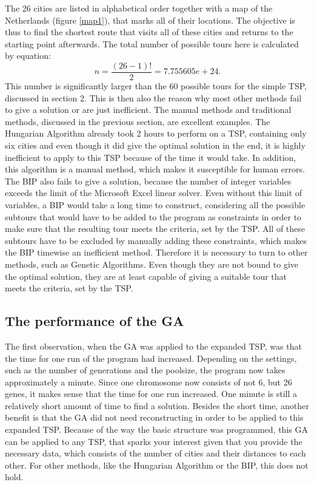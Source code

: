 \par
The 26 cities are listed in alphabetical order together with a map of the Netherlands (figure \ref{map1}), that marks all of their locations. The objective is thus to find the shortest route that visits all of these cities and returns to the starting point afterwards. The total number of possible tours here is calculated by equation: %
\[n = \frac{(26-1)!}{2} =  7.755605e+24.\]
This number is significantly larger than the 60 possible tours for the simple TSP, discussed in section 2. This is then also the reason why most other methods fail to give a solution or are just inefficient. The manual methods and traditional methods, discussed in the previous section, are excellent examples. The Hungarian Algorithm already took 2 hours to perform on a TSP, containing only six cities and even though it did give the optimal solution in the end, it is highly inefficient to apply to this TSP because of the time it would take. In addition, this algorithm is a manual method, which makes it susceptible for human errors. The BIP also fails to give a solution, because the number of integer variables exceeds the limit of the Microsoft Excel linear solver. Even without this limit of variables, a BIP would take a long time to construct, considering all the possible subtours that would have to be added to the program as constraints in order to make sure that the resulting tour meets the criteria, set by the TSP. All of these subtours have to be excluded by manually adding these constraints, which makes the BIP timewise an inefficient method. Therefore it is necessary to turn to other methods, such as Genetic Algorithms. Even though they are not bound to give the optimal solution, they are at least capable of giving a suitable tour that meets the criteria, set by the TSP.



\subsection{The performance of the GA} %
\par
The first observation, when the GA was applied to the expanded TSP, was that the time for one run of the program had increased. Depending on the settings, such as the number of generations and the poolsize, the program now takes approximately a minute. Since one chromosome now consists of not 6, but 26 genes, it makes sense that the time for one run increased. One minute is still a relatively short amount of time to find a solution. Besides the short time, another benefit is that the GA did not need reconstructing in order to be applied to this expanded TSP. Because of the way the basic structure was programmed, this GA can be applied to any TSP, that sparks your interest given that you provide the necessary data, which consists of the number of cities and their distances to each other. For other methods, like the Hungarian Algorithm or the BIP, this does not hold. 


